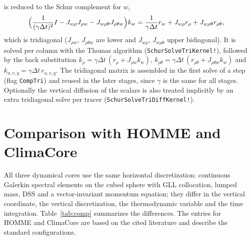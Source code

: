 \documentclass[11pt,a4paper]{article}
\newcommand{\code}[1]{\texttt{#1}}
\begin{document}
is reduced to the Schur complement for $w$,
\begin{equation}
  \Bigl(\frac{1}{(\gamma\Delta t)^2}I - J_{w\rho}J_{\rho w}
    - J_{w\rho\theta}J_{\rho\theta w}\Bigr) k_w
  = \frac{1}{\gamma\Delta t} r_w + J_{w\rho} r_\rho + J_{w\rho\theta} r_{\rho\theta},
\end{equation}
which is tridiagonal ($J_{\rho w}$, $J_{\rho\theta w}$ are lower and
$J_{w\rho}$, $J_{w\rho\theta}$ upper bidiagonal). It is solved per column
with the Thomas algorithm (\code{SchurSolveTriKernel!}), followed by the back
substitution $k_\rho = \gamma\Delta t\,(r_\rho + J_{\rho w}k_w)$,
$k_{\rho\theta} = \gamma\Delta t\,(r_{\rho\theta} + J_{\rho\theta w}k_w)$
and $k_{u,v,q} = \gamma\Delta t\,r_{u,v,q}$. The tridiagonal matrix is
assembled in the first solve of a step (flag \code{CompTri}) and reused in the
later stages, since $\gamma$ is the same for all stages. Optionally the vertical diffusion of the scalars
is also treated implicitly by an extra tridiagonal solve per tracer
(\code{SchurSolveTriDiffKernel!}).

\section{Comparison with HOMME and ClimaCore}

All three dynamical cores use the same horizontal discretization: continuous
Galerkin spectral elements on the cubed sphere with GLL collocation, lumped
mass, DSS and a vector-invariant momentum equation; they differ in the vertical
coordinate, the vertical discretization, the thermodynamic variable and the
time integration. Table~\ref{tab:comp} summarizes the differences. The
entries for HOMME and ClimaCore are based on the cited literature and
describe the standard configurations.
\end{document}
